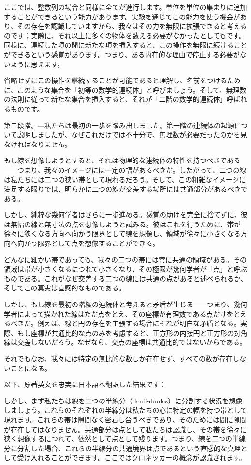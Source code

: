 \documentclass[a4paper,11pt,openany]{ltjsbook}
\begin{document}
ここでは、整数列の場合と同様に全てが進行します。単位を単位の集まりに追加することができるという能力があります。実験を通じてこの能力を使う機会があり、その存在を認識していますから、我々はその力を無限に拡張できると考えるのです；実際に、それ以上に多くの物体を数える必要がなかったとしてもです。同様に、連続した項の間に新たな項を挿入すると、この操作を無限に続けることができるという感覚があります。つまり、ある内在的な理由で停止する必要がないように思えます。

省略せずにこの操作を継続することが可能であると理解し、名前をつけるために、このような集合を「初等の数学的連続体」と呼びましょう。そして、無理数の法則に従って新たな集合を挿入すると、それが「二階の数学的連続体」呼ばれるものです。

第二段階。—私たちは最初の一歩を踏み出しました。第一階の連続体の起源について説明しましたが、なぜこれだけでは不十分で、無理数が必要だったのかを見なければなりません。

もし線を想像しようとすると、それは物理的な連続体の特性を持つべきである——つまり、我々のイメージには一定の幅があるべきだ。したがって、二つの線は私たちには二つの狭い帯として現れるだろう。そして、この粗雑なイメージに満足する限りでは、明らかに二つの線が交差する場所には共通部分があるべきである。

しかし、純粋な幾何学者はさらに一歩進める。感覚の助けを完全に捨てずに、彼は無幅の線と無寸法の点を想像しようと試みる。彼はこれを行うために、帯が徐々に狭くなる方向へ向かう限界として線を想像し、領域が徐々に小さくなる方向へ向かう限界として点を想像することができる。

どんなに細かい帯であっても、我々の二つの帯には常に共通の領域がある。その領域は帯が小さくなるにつれて小さくなり、その極限が幾何学者が「点」と呼ぶものである。これがなぜ交差する二つの線には共通の点があると述べられるか、そしてこの真実は直感的なものである。

しかし、もし線を最初の階級の連続体と考えると矛盾が生じる——つまり、幾何学者によって描かれた線はただ点をとえ、その座標が有理数である点だけをとえるべきだ。例えば、線と円の存在を主張する場合にそれが明白な矛盾となる。実際、もし座標が共通比的な点のみを考慮すると、正方形の内接円と正方形の対角線は交差しないだろう。なぜなら、交点の座標は共通比的ではないからである。

それでもなお、我々には特定の無比的な数しか存在せず、すべての数が存在しないことになる。

以下、原著英文を忠実に日本語へ翻訳した結果です：

しかし、まず私たちは線を二つの半線分（dcnii-dnnlcs）に分割する状況を想像しましょう。これらのそれぞれの半線分は私たちの心に特定の幅を持つ帯として現れます。これらの帯は隙間なく密着し合うべきであり、そのためには間に隙間が存在してはなりません。共通部分は点として私たちは認識し、その帯を徐々に狭く想像するにつれて、依然として点として残ります。つまり、線を二つの半線分に分割した場合、これらの半線分の共通境界は点であるという直感的な真理として受け入れることができます。ここではクロネッカーの概念が認識されます。
\end{document}

